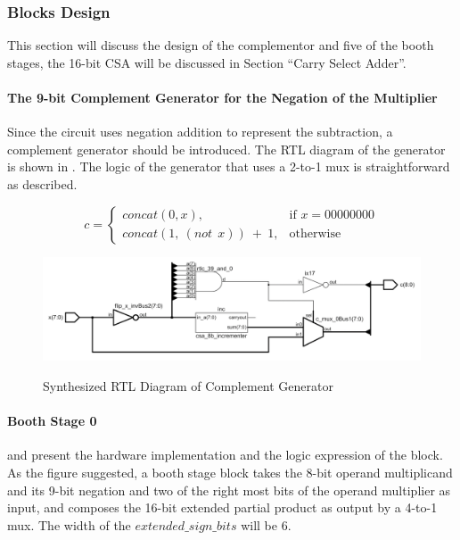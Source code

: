 \subsubsection{Blocks Design}

This section will discuss the design of the complementor and five of the booth stages,
the 16-bit CSA will be discussed in Section “Carry Select Adder”.

\paragraph{The 9-bit Complement Generator for the Negation of the Multiplier}
Since the circuit uses negation addition to represent the subtraction, a complement generator should be introduced.
The RTL diagram of the generator is shown in .
The logic of the generator that uses a 2-to-1 mux is straightforward as  described.

\begin{equation}
	c =
	\begin{cases}
		concat(0, x),                 & \text{if } x = 00000000 \\
		concat(1,\ (not\ \ x))\ +\ 1, & \text{otherwise}
	\end{cases}
	\label{exp:complementor_exp}
\end{equation}

\begin{figure}[!ht]
	\centering
	\caption{Synthesized RTL Diagram of Complement Generator}
	\includegraphics[width=\textwidth]{../img/complementor_rtl.png}
	\label{fig:complementor_rtl}
\end{figure}

\paragraph{Booth Stage 0}
 and  present the hardware implementation and the logic expression of the block.
As the figure suggested, a booth stage block takes the 8-bit operand multiplicand and its 9-bit negation and two of the right most bits of the operand multiplier
as input, and composes the 16-bit extended partial product as output by a 4-to-1 mux. The width of the \(extended\_sign\_bits\) will be 6.

